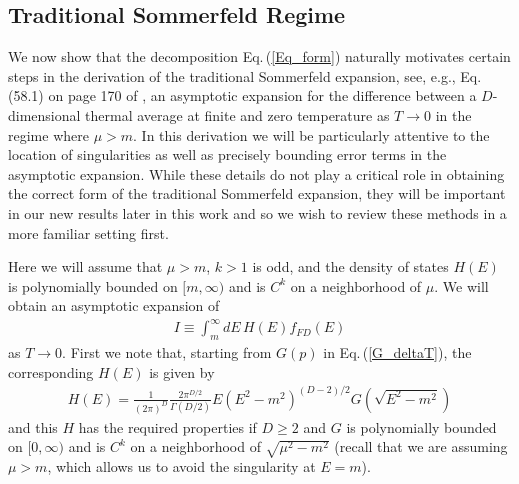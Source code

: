 \documentclass[sn-mathphys,Numbered]{sn-jnl}
\newcommand{\req}[1]{Eq.\,(\ref{#1})}
\begin{document}
\subsection{Traditional Sommerfeld Regime}\label{sec:traditional_Sommerfeld}
We now show that the decomposition \req{Eq_form} naturally motivates certain steps in the derivation of the traditional Sommerfeld expansion, see, e.g., Eq. (58.1) on page 170 of \cite{landau2013statistical}, an asymptotic expansion for the difference between a $D$-dimensional thermal average at finite and zero temperature as $T\to 0$ in the regime where $\mu>m$. In this derivation we will be particularly attentive to the location of singularities as well as precisely bounding error terms in the asymptotic expansion. While these details do not play a critical role in obtaining the correct form of the traditional Sommerfeld expansion, they will be important in our new results later in this work and so we wish to review these methods in a more familiar setting first.


Here we will assume that $\mu>m$, $k>1$ is odd, and the density of states $H(E)$ is polynomially bounded on $[m,\infty)$ and is $C^k$ on a neighborhood of $\mu$. We will obtain an asymptotic expansion of 
\begin{align}\label{eq:traditional_sommerfeld_I}
 I\equiv\int_m^\infty dE\, H(E) f_{FD}(E)
\end{align}
as $T\to 0$. First we note that, starting from $G(p)$ in \req{G_deltaT}, the corresponding $H(E)$ is given by
\begin{align}
 H(E)= \frac{1}{(2\pi)^D}\frac{2\pi^{D/2}}{\Gamma(D/2)} E(E^2-m^2)^{(D-2)/2} G(\sqrt{E^2-m^2}) 
\end{align}
and this $H$ has the required properties if $D\geq 2$ and $G$ is polynomially bounded on $[0,\infty)$ and is $C^k$ on a neighborhood of $\sqrt{\mu^2-m^2}$ (recall that we are assuming $\mu>m$, which allows us to avoid the singularity at $E=m$).
\end{document}
